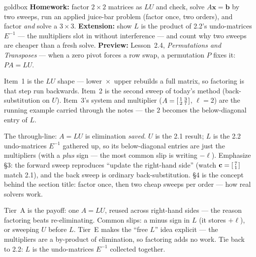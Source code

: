 \documentclass[10pt]{article}
\newcommand{\xx}{\mathbf{x}}
\newcommand{\bb}{\mathbf{b}}
\newcommand{\cc}{\mathbf{c}}
\begin{document}
\begin{skillbox}{goldbox}
\textbf{Homework:} factor $2\times2$ matrices as $LU$ and check, solve $A\xx=\bb$ by two sweeps, run an
applied juice-bar problem (factor once, two orders), and factor \emph{and} solve a $3\times3$.
\textbf{Extension:} show $L$ is the product of 2.2's undo-matrices $E^{-1}$ --- the multipliers slot in
without interference --- and count why two sweeps are cheaper than a fresh solve. \textbf{Preview:}
Lesson~2.4, \emph{Permutations and Transposes} --- when a zero pivot forces a row swap, a permutation
$P$ fixes it: $PA=LU$.
\end{skillbox}

\begin{teachernote}[Warm-Up]
Item~1 is the $LU$ shape --- lower~$\times$~upper rebuilds a full matrix, so factoring is that step run
backwards. Item~2 is the second sweep of today's method (back-substitution on $U$). Item~3's system and
multiplier ($A=\begin{bsmallmatrix} 1&3\\2&7 \end{bsmallmatrix}$, $\ell=2$) are the running example
carried through the notes --- the $2$ becomes the below-diagonal entry of $L$.
\end{teachernote}

\begin{teachernote}
The through-line: $A=LU$ is elimination \emph{saved}. $U$ is the 2.1 result; $L$ is the 2.2
undo-matrices $E^{-1}$ gathered up, so its below-diagonal entries are just the multipliers (with a
\emph{plus} sign --- the most common slip is writing $-\ell$). Emphasize \S3: the forward sweep
reproduces ``update the right-hand side'' (watch $\cc=\begin{bsmallmatrix} 7\\1 \end{bsmallmatrix}$ match
2.1), and the back sweep is ordinary back-substitution. \S4 is the concept behind the section title:
factor once, then two cheap sweeps per order --- how real solvers work.
\end{teachernote}

\begin{teachernote}
Tier~A is the payoff: one $A=LU$, reused across right-hand sides --- the reason factoring beats
re-eliminating. Common slips: a minus sign in $L$ (it stores $+\ell$), or sweeping $U$ before $L$.
Tier~E makes the ``free $L$'' idea explicit --- the multipliers are a by-product of elimination, so
factoring adds no work. Tie back to 2.2: $L$ is the undo-matrices $E^{-1}$ collected together.
\end{teachernote}
\end{document}
